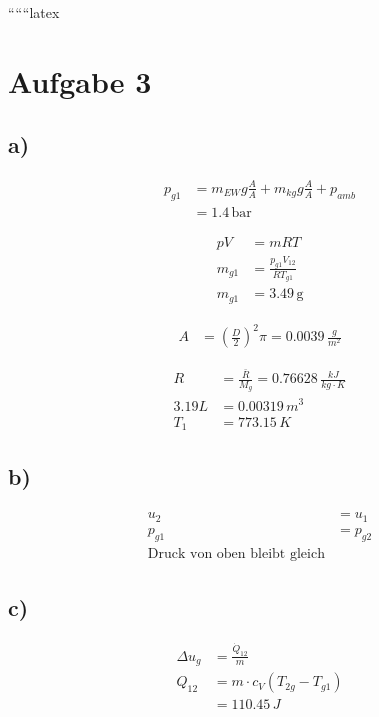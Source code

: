 
``````latex


\section*{Aufgabe 3}

\subsection*{a)}
\begin{align*}
    p_{g1} &= m_{EW} g \frac{A}{A} + m_{kg} g \frac{A}{A} + p_{amb} \\
    &= 1.4 \, \text{bar}
\end{align*}

\begin{align*}
    pV &= mRT \\
    m_{g1} &= \frac{p_{g1} V_{12}}{R T_{g1}} \\
    m_{g1} &= 3.49 \, \text{g}
\end{align*}

\begin{align*}
    A &= (\frac{D}{2})^2 \pi = 0.0039 \, \frac{g}{m^2}
\end{align*}

\begin{align*}
    R &= \frac{\bar{R}}{M_g} = 0.76628 \, \frac{kJ}{kg \cdot K} \\
    3.19L &= 0.00319 \, m^3 \\
    T_1 &= 773.15 \, K
\end{align*}

\subsection*{b)}
\begin{align*}
    u_2 &= u_1 \\
    p_{g1} &= p_{g2} \\
    \text{Druck von oben bleibt gleich}
\end{align*}

\subsection*{c)}
\begin{align*}
    \Delta u_{g} &= \frac{\dot{Q}_{12}}{m} \\
    Q_{12} &= m \cdot c_V (T_{2g} - T_{g1}) \\
    &= 110.45 \, J
\end{align*}

